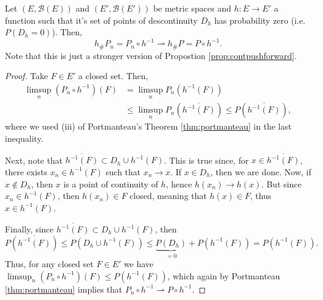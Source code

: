 \begin{theorem}
	Let $(E, \mathcal B(E))$ and $(E', \mathcal B(E'))$
	be metric spaces and  $h:E \to E'$ a function
	such that it's set of points of descontinuity $D_h$ has
	probability zero (i.e. $P(D_h = 0)$).
	Then,
	\begin{equation}
		h_\# P_{n} = P_{n} \circ h^{-1} \rightharpoonup
		h_\# P = P \circ h^{-1}.
	\end{equation}
	Note that this is just a stronger version of Propostion \ref{prop:contpushforward}.
\end{theorem}
\begin{proof}
	Take $F \in E'$ a closed set. Then,
	\begin{align*}
		\limsup_n (P_n\circ h^{-1})(F) & =
		\limsup_n P_n(h^{-1}(F))              \\
		                               & \leq
		\limsup_n P_n(\overline{h^{-1}(F)}) \leq
		P(\overline{h^{-1}(F)}),
	\end{align*}
	where we used (iii) of Portmanteau's Theorem \ref{thm:portmanteau} in the last inequality.

	Next, note that $\overline{h^{-1}(F)} \subset D_h \cup h^{-1}(F)$. This is true
	since, for $x \in \overline{h^{-1}(F)}$, there exists $x_n \in h^{-1}(F)$ such
	that $x_n \to x$. If $x \in D_h$, then we are done. Now, if $x \notin D_h$,
	then $x$ is a point of continuity of $h$, hence $h(x_n) \to h(x)$.
	But since $x_n \in h^{-1}(F)$, then $h(x_n) \in F$ closed,
	meaning that $h(x) \in F$, thus $x \in h^{-1}(F)$.

	Finally, since $\overline{h^{-1}(F)} \subset D_h \cup h^{-1}(F)$, then
	\begin{displaymath}
		P\left(\overline{h^{-1}(F)}\right) \leq
		P(D_h \cup h^{-1}(F)) \leq
		\underbrace{P(D_h)}_{=0} +P(h^{-1}(F)) =
		P(h^{-1}(F)).
	\end{displaymath}
	Thus, for any closed set $F \in E'$ we have
	$\limsup_n (P_n\circ h^{-1})(F) \leq P(h^{-1}(F))$, which again by
	Portmanteau \ref{thm:portmanteau} implies that
	$P_{n} \circ h^{-1} \rightharpoonup P \circ h^{-1}$.

\end{proof}

